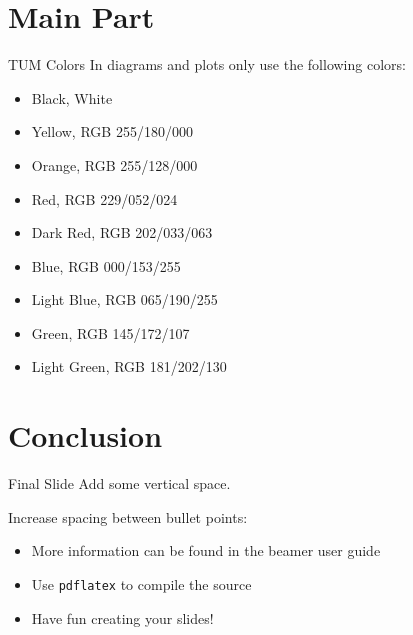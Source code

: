 \documentclass[10pt,t]{beamer}
\begin{document}
\section{Main Part}


\begin{frame}{TUM Colors}
In diagrams and plots only use the following colors:
\begin{itemize}
\item Black, White
\item \textcolor{TUMBeamerYellow}{Yellow, RGB 255/180/000}
\item \textcolor{TUMBeamerOrange}{Orange, RGB 255/128/000}
\item \textcolor{TUMBeamerRed}{Red, RGB 229/052/024}
\item \textcolor{TUMBeamerDarkRed}{Dark Red, RGB 202/033/063}
\item \textcolor{TUMBeamerBlue}{Blue, RGB 000/153/255}
\item \textcolor{TUMBeamerLightBlue}{Light Blue, RGB 065/190/255}
\item \textcolor{TUMBeamerGreen}{Green, RGB 145/172/107}
\item \textcolor{TUMBeamerLightGreen}{Light Green, RGB 181/202/130}
\end{itemize}
\end{frame}



\section{Conclusion}


\begin{frame}{Final Slide}
Add some vertical space.

\vspace{8mm}
Increase spacing between bullet points:

\vspace{5mm}
\begin{itemize}\addtolength{\itemsep}{5mm}
\item More information can be found in the \alert{beamer user guide}
\item Use \texttt{pdflatex} to compile the source
\item Have fun creating your slides!
\end{itemize}
\end{frame}
\end{document}
